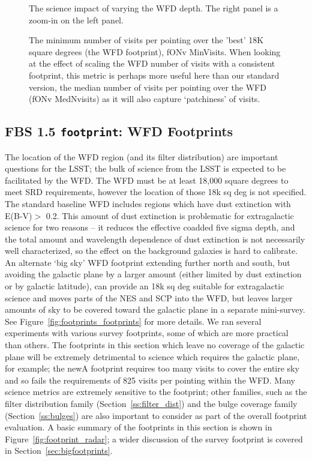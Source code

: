 \begin{figure}
\caption{The science impact of varying the WFD depth. The right panel is a zoom-in on the left panel.}\label{fig:wfd_depth_radar}
\end{figure}

\begin{figure}
\caption{The minimum number of visits per pointing over the 'best' 18K square degrees (the WFD footprint), fONv MinVisits. When looking at the effect of scaling the WFD number of visits with a consistent footprint, this metric is perhaps more useful here than our standard version, the median number of visits per pointing over the WFD (fONv MedNvisits) as it will also capture `patchiness' of visits.}
\label{fig:wfddepth_fo}
\end{figure}


\subsection{FBS 1.5 {\tt footprint}: WFD Footprints}\label{ss:footprints}

The location of the WFD region (and its filter distribution) are important questions for the LSST; the bulk of science from the LSST is expected to be facilitated by the WFD. The WFD must be at least 18,000 square degrees to meet SRD requirements, however the location of those 18k sq deg is not specified. The standard baseline WFD includes regions which have dust extinction with E(B-V)$>$ 0.2. This amount of dust extinction is problematic for extragalactic science for two reasons --  it reduces the effective coadded five sigma depth, and the total amount and wavelength dependence of dust extinction is not necessarily well characterized, so the effect on the background galaxies is hard to calibrate. An alternate `big sky' WFD footprint extending further north and south, but avoiding the galactic plane by a larger amount (either limited by dust extinction or by galactic latitude), can provide an 18k sq deg suitable for extragalactic science and moves parts of the NES and SCP into the WFD, but leaves larger amounts of sky to be covered toward the galactic plane in a separate mini-survey. See Figure~\ref{fig:footprints_footprints} for more details. We ran several experiments with various survey footprints, some of which are more practical than others. The footprints in this section which leave no coverage of the galactic plane will be extremely detrimental to science which requires the galactic plane, for example; the newA footprint requires too many visits to cover the entire sky and so fails the requirements of 825 visits per pointing within the WFD. Many science metrics are extremely sensitive to the footprint; other families, such as the filter distribution family (Section~\ref{ss:filter_dist}) and the bulge coverage family (Section~\ref{ss:bulges}) are also important to consider as part of the overall footprint evaluation. A basic summary of the footprints in this section is shown in Figure~\ref{fig:footprint_radar}; a wider discussion of the survey footprint is covered in Section~\ref{sec:bigfootprints}. 

